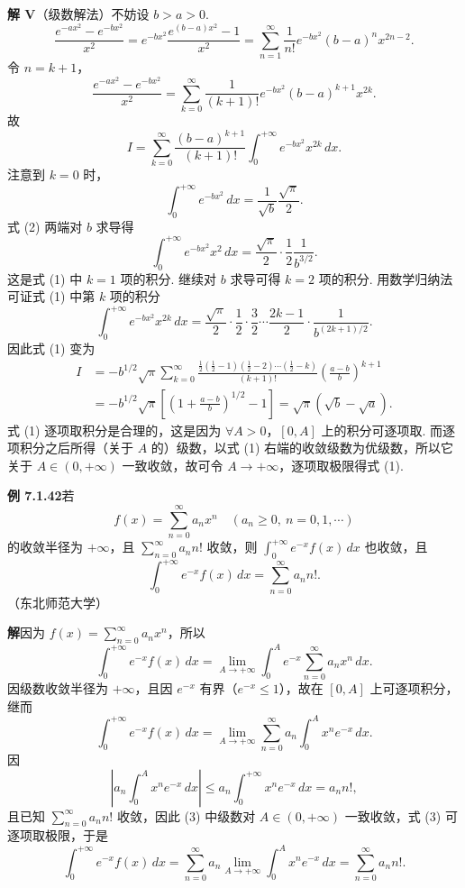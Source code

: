 \documentclass[UTF8,12pt,a4paper,fontset=fandol]{ctexart}
\begin{document}
\noindent\textbf{解 V}\quad （级数解法）不妨设 $b>a>0$.
\[
\frac{e^{-ax^2}-e^{-bx^2}}{x^2}
=e^{-bx^2}\frac{e^{(b-a)x^2}-1}{x^2}
=\sum_{n=1}^{\infty}\frac1{n!}e^{-bx^2}(b-a)^n x^{2n-2}.
\]
令 $n=k+1$，
\[
\frac{e^{-ax^2}-e^{-bx^2}}{x^2}
=\sum_{k=0}^{\infty}\frac1{(k+1)!}e^{-bx^2}(b-a)^{k+1}x^{2k}.
\]
故
\[
I=\sum_{k=0}^{\infty}\frac{(b-a)^{k+1}}{(k+1)!}\int_0^{+\infty}e^{-bx^2}x^{2k}\,dx.
\tag{1}
\]
注意到 $k=0$ 时，
\[
\int_0^{+\infty}e^{-bx^2}\,dx=\frac1{\sqrt b}\frac{\sqrt\pi}{2}.
\tag{2}
\]
式 (2) 两端对 $b$ 求导得
\[
\int_0^{+\infty}e^{-bx^2}x^2\,dx=\frac{\sqrt\pi}{2}\cdot\frac12\frac1{b^{3/2}}.
\]
这是式 (1) 中 $k=1$ 项的积分. 继续对 $b$ 求导可得 $k=2$ 项的积分. 用数学归纳法可证式 (1) 中第 $k$ 项的积分
\[
\int_0^{+\infty}e^{-bx^2}x^{2k}\,dx
=\frac{\sqrt\pi}{2}\cdot\frac12\cdot\frac32\cdots\frac{2k-1}{2}\cdot\frac1{b^{(2k+1)/2}}.
\]
因此式 (1) 变为
\[
\begin{aligned}
I
&=-b^{1/2}\sqrt\pi
\sum_{k=0}^{\infty}
\frac{\frac12(\frac12-1)(\frac12-2)\cdots(\frac12-k)}{(k+1)!}
\left(\frac{a-b}{b}\right)^{k+1}\\
&=-b^{1/2}\sqrt\pi\left[\left(1+\frac{a-b}{b}\right)^{1/2}-1\right]
=\sqrt\pi(\sqrt b-\sqrt a).
\end{aligned}
\]
式 (1) 逐项取积分是合理的，这是因为 $\forall A>0$，$[0,A]$ 上的积分可逐项取. 而逐项积分之后所得（关于 $A$ 的）级数，以式 (1) 右端的收敛级数为优级数，所以它关于 $A\in(0,+\infty)$ 一致收敛，故可令 $A\to+\infty$，逐项取极限得式 (1).

\noindent\textbf{例 7.1.42}\quad 若
\[
f(x)=\sum_{n=0}^{\infty}a_nx^n\quad(a_n\ge0,\ n=0,1,\cdots)
\]
的收敛半径为 $+\infty$，且 $\displaystyle\sum_{n=0}^{\infty}a_nn!$ 收敛，则 $\displaystyle\int_0^{+\infty}e^{-x}f(x)\,dx$ 也收敛，且
\[
\int_0^{+\infty}e^{-x}f(x)\,dx=\sum_{n=0}^{\infty}a_nn!.
\tag{1}
\]
（东北师范大学）

\noindent\textbf{解}\quad 因为 $f(x)=\displaystyle\sum_{n=0}^{\infty}a_nx^n$，所以
\[
\int_0^{+\infty}e^{-x}f(x)\,dx
=\lim_{A\to+\infty}\int_0^Ae^{-x}\sum_{n=0}^{\infty}a_nx^n\,dx.
\tag{2}
\]
因级数收敛半径为 $+\infty$，且因 $e^{-x}$ 有界（$e^{-x}\le1$），故在 $[0,A]$ 上可逐项积分，继而
\[
\int_0^{+\infty}e^{-x}f(x)\,dx
=\lim_{A\to+\infty}\sum_{n=0}^{\infty}a_n\int_0^Ax^ne^{-x}\,dx.
\tag{3}
\]
因
\[
\left|a_n\int_0^Ax^ne^{-x}\,dx\right|
\le a_n\int_0^{+\infty}x^ne^{-x}\,dx=a_nn!,
\]
且已知 $\displaystyle\sum_{n=0}^{\infty}a_nn!$ 收敛，因此 (3) 中级数对 $A\in(0,+\infty)$ 一致收敛，式 (3) 可逐项取极限，于是
\[
\int_0^{+\infty}e^{-x}f(x)\,dx
=\sum_{n=0}^{\infty}a_n\lim_{A\to+\infty}\int_0^Ax^ne^{-x}\,dx
=\sum_{n=0}^{\infty}a_nn!.
\]
\end{document}
